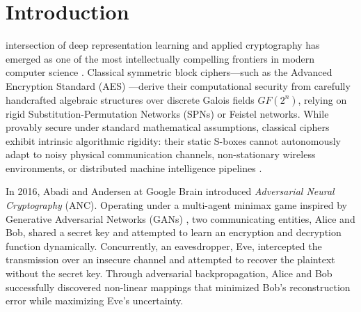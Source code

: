 \documentclass[journal,10pt,twocolumn]{IEEEtran}
\begin{document}
\IEEEpeerreviewmaketitle

\section{Introduction}
 intersection of deep representation learning and applied cryptography has emerged as one of the most intellectually compelling frontiers in modern computer science \cite{abadi2016learning,coutinho2018learning}. Classical symmetric block ciphers—such as the Advanced Encryption Standard (AES) \cite{daemen2002design}—derive their computational security from carefully handcrafted algebraic structures over discrete Galois fields $GF(2^n)$, relying on rigid Substitution-Permutation Networks (SPNs) or Feistel networks. While provably secure under standard mathematical assumptions, classical ciphers exhibit intrinsic algorithmic rigidity: their static S-boxes cannot autonomously adapt to noisy physical communication channels, non-stationary wireless environments, or distributed machine intelligence pipelines \cite{bloch2008wireless}.

In 2016, Abadi and Andersen \cite{abadi2016learning} at Google Brain introduced \textit{Adversarial Neural Cryptography} (ANC). Operating under a multi-agent minimax game inspired by Generative Adversarial Networks (GANs) \cite{goodfellow2014generative}, two communicating entities, Alice and Bob, shared a secret key and attempted to learn an encryption and decryption function dynamically. Concurrently, an eavesdropper, Eve, intercepted the transmission over an insecure channel and attempted to recover the plaintext without the secret key. Through adversarial backpropagation, Alice and Bob successfully discovered non-linear mappings that minimized Bob's reconstruction error while maximizing Eve's uncertainty.
\end{document}
